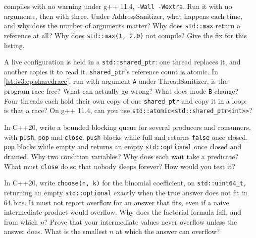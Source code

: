 \begin{question}\label{iq:iv3:cpp:49}
 compiles with no warning under g++ 11.4, \texttt{-Wall -Wextra}. Run it with no arguments, then with three. Under AddressSanitizer, what happens each time, and why does the number of arguments matter? Why does \texttt{std::max} return a reference at all? Why does \texttt{std::max(1, 2.0)} not compile? Give the fix for this listing.
\label{lst:iv3:cp:maxdangle}
\end{question}

\begin{question}\label{iq:iv3:cpp:50}
A live configuration is held in a \texttt{std::shared\_ptr}: one thread replaces it, and another copies it to read it. \texttt{shared\_ptr}'s reference count is atomic. In \cref{lst:iv3:cp:sharedrace}, run with argument \texttt{A} under ThreadSanitizer, is the program race-free? What can actually go wrong? What does mode \texttt{B} change? Four threads each hold their own copy of one \texttt{shared\_ptr} and copy it in a loop: is that a race? On g++ 11.4, can you use \texttt{std::atomic<std::shared\_ptr<int>{}>}?
\label{lst:iv3:cp:sharedrace}
\end{question}

\begin{question}\label{iq:iv3:cpp:51}
In C++20, write a bounded blocking queue for several producers and consumers, with \texttt{push}, \texttt{pop} and \texttt{close}. \texttt{push} blocks while full and returns \texttt{false} once closed. \texttt{pop} blocks while empty and returns an empty \texttt{std::optional} once closed and drained. Why two condition variables? Why does each wait take a predicate? What must \texttt{close} do so that nobody sleeps forever? How would you test it?
\end{question}

\begin{question}\label{iq:iv3:cpp:52}
In C++20, write \texttt{choose(n, k)} for the binomial coefficient, on \texttt{std::uint64\_t}, returning an empty \texttt{std::optional} exactly when the true answer does not fit in 64 bits. It must not report overflow for an answer that fits, even if a naive intermediate product would overflow. Why does the factorial formula fail, and from which $n$? Prove that your intermediate values never overflow unless the answer does. What is the smallest $n$ at which the answer can overflow?
\end{question}

